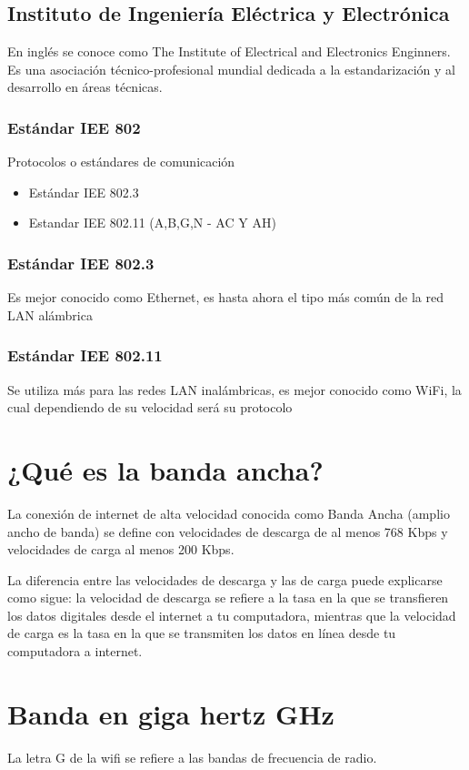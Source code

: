 \documentclass[letterpaper,12pt]{article}
\begin{document}
\begin{sloppypar}
\subsection{Instituto de Ingeniería Eléctrica y Electrónica}
En inglés se conoce como The Institute of Electrical and Electronics Enginners. Es una asociación técnico-profesional mundial dedicada a la estandarización y al desarrollo en áreas técnicas.

\subsubsection{Estándar IEE 802}
Protocolos o estándares de comunicación 
\begin{itemize}
    \item Estándar IEE 802.3
    \item Estandar IEE 802.11 (A,B,G,N - AC Y AH)
\end{itemize}

\subsubsection{Estándar IEE 802.3}
Es mejor conocido como Ethernet, es hasta ahora el tipo más común de la red LAN alámbrica

\subsubsection{Estándar IEE 802.11}
Se utiliza más para las redes LAN inalámbricas, es mejor conocido como WiFi, la cual dependiendo de su velocidad será su protocolo

\section{¿Qué es la banda ancha?}
La conexión de internet de alta velocidad conocida como Banda Ancha (amplio ancho de banda) se define con velocidades de descarga de al menos 768 Kbps y velocidades de carga al menos 200 Kbps. 

La diferencia entre las velocidades de descarga y las de carga puede explicarse como sigue: la velocidad de descarga se refiere a la tasa en la que se transfieren los datos digitales desde el internet a tu computadora, mientras que la velocidad de carga es la tasa en la que se transmiten los datos en línea desde tu computadora a internet.

\section{Banda en giga hertz GHz}
La letra G de la wifi se refiere a las bandas de frecuencia de radio.


\end{sloppypar}
\end{document}

